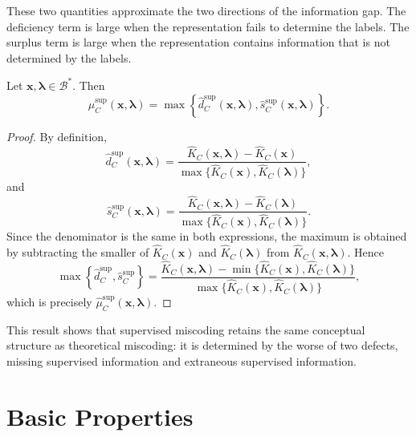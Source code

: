 These two quantities approximate the two directions of the information gap. The deficiency term is large when the representation fails to determine the labels. The surplus term is large when the representation contains information that is not determined by the labels.

\begin{proposition}
\label{prop:supervised_miscoding_max_components}
Let \(\mathbf{x},\boldsymbol{\lambda}\in\mathcal B^\ast\). Then
\[
    \hat\mu_C^{\mathrm{sup}}(\mathbf{x},\boldsymbol{\lambda})
    =
    \max\left\{
        \hat d_C^{\mathrm{sup}}(\mathbf{x},\boldsymbol{\lambda}),
        \hat s_C^{\mathrm{sup}}(\mathbf{x},\boldsymbol{\lambda})
    \right\}.
\]
\end{proposition}

\begin{proof}
By definition,
\[
    \hat d_C^{\mathrm{sup}}(\mathbf{x},\boldsymbol{\lambda})
    =
    \frac{
        \hat K_C(\mathbf{x},\boldsymbol{\lambda})-\hat K_C(\mathbf{x})
    }
    {
        \max\{\hat K_C(\mathbf{x}),\hat K_C(\boldsymbol{\lambda})\}
    },
\]
and
\[
    \hat s_C^{\mathrm{sup}}(\mathbf{x},\boldsymbol{\lambda})
    =
    \frac{
        \hat K_C(\mathbf{x},\boldsymbol{\lambda})-\hat K_C(\boldsymbol{\lambda})
    }
    {
        \max\{\hat K_C(\mathbf{x}),\hat K_C(\boldsymbol{\lambda})\}
    }.
\]
Since the denominator is the same in both expressions, the maximum is obtained by subtracting the smaller of \(\hat K_C(\mathbf{x})\) and \(\hat K_C(\boldsymbol{\lambda})\) from \(\hat K_C(\mathbf{x},\boldsymbol{\lambda})\). Hence
\[
    \max\left\{
        \hat d_C^{\mathrm{sup}},
        \hat s_C^{\mathrm{sup}}
    \right\}
    =
    \frac{
        \hat K_C(\mathbf{x},\boldsymbol{\lambda})
        -
        \min\{\hat K_C(\mathbf{x}),\hat K_C(\boldsymbol{\lambda})\}
    }
    {
        \max\{\hat K_C(\mathbf{x}),\hat K_C(\boldsymbol{\lambda})\}
    },
\]
which is precisely \(\hat\mu_C^{\mathrm{sup}}(\mathbf{x},\boldsymbol{\lambda})\).
\end{proof}

This result shows that supervised miscoding retains the same conceptual structure as theoretical miscoding: it is determined by the worse of two defects, missing supervised information and extraneous supervised information.

\section{Basic Properties}
\label{sec:supervised_miscoding_properties}

